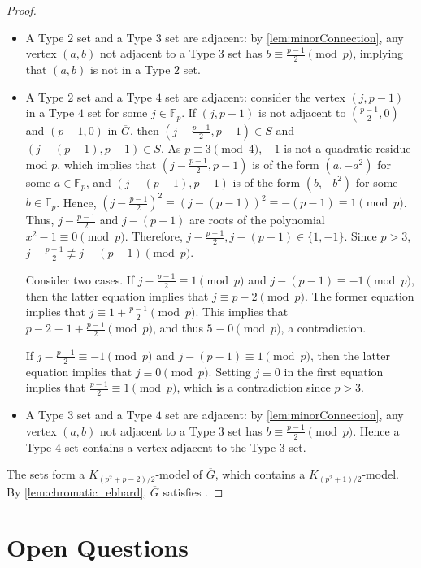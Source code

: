 \documentclass[11pt]{article}
\numberwithin{equation}{section}
\theoremstyle{plain}
\theoremstyle{definition}
\newcommand{\F}{\mathbb{F}}
\begin{document}
\begin{proof}
\begin{itemize}
        \item A Type $2$ set and a Type $3$ set are adjacent: by \cref{lem:minorConnection}, any vertex $(a,b)$ not adjacent to a Type $3$ set has $b \equiv \frac{p-1}{2} \pmod{p}$, implying that $(a,b)$ is not in a Type $2$ set.
        \item A Type $2$ set and a Type $4$ set are adjacent: consider the vertex $(j, p-1)$ in a Type $4$ set for some $j \in \F_p$. If $(j, p-1)$ is not adjacent to $(\frac{p-1}{2} , 0)$ and $(p-1, 0)$ in $\overline{G}$, then $(j - \frac{p-1}{2} , p-1) \in S$ and $(j - (p-1), p-1) \in S$. As $p \equiv 3 \pmod{4}$, $-1$ is not a quadratic residue mod $p$, which implies that $(j - \frac{p-1}{2} , p-1)$ is of the form $(a, -a^2)$ for some $a \in \F_p$, and $(j - (p-1), p-1)$ is of the form $(b, -b^2)$ for some $b \in \F_p$. Hence, $(j- \frac{p-1}{2})^2 \equiv (j - (p-1))^2 \equiv -(p-1) \equiv 1 \pmod{p}$. Thus, $j - \frac{p-1}{2}$ and $j - (p-1)$ are roots of the polynomial $x^2 - 1 \equiv 0 \pmod{p}$. Therefore, $j - \frac{p-1}{2}, j - (p-1) \in \{1, -1\}$. Since $p > 3$, $j - \frac{p-1}{2} \not\equiv j - (p-1) \pmod{p}$.

              Consider two cases. If $j - \frac{p-1}{2} \equiv 1 \pmod{p}$ and $j - (p-1) \equiv -1 \pmod{p}$, then the latter equation implies that $j \equiv p - 2 \pmod{p}$. The former equation implies that $j \equiv 1 + \frac{p-1}{2} \pmod{p}$. This implies that $p - 2 \equiv 1 + \frac{p-1}{2} \pmod{p}$, and thus $5 \equiv 0 \pmod{p}$, a contradiction.

              If $j - \frac{p-1}{2} \equiv -1 \pmod{p}$ and $j - (p-1) \equiv 1 \pmod{p}$, then the latter equation implies that $j \equiv 0 \pmod{p}$. Setting $j \equiv 0$ in the first equation implies that $\frac{p-1}{2} \equiv 1 \pmod{p}$, which is a contradiction since $p > 3$.

        \item A Type $3$ set and a Type $4$ set are adjacent: by \cref{lem:minorConnection}, any vertex $(a,b)$ not adjacent to a Type $3$ set has $b \equiv \frac{p-1}{2} \pmod{p}$. Hence a Type $4$ set contains a vertex adjacent to the Type $3$ set.
    \end{itemize}
    The sets form a $K_{(p^2 + p - 2) / 2}$-model of $\overline{G}$, which contains a $K_{(p^2 + 1) / 2}$-model. By \cref{lem:chromatic_ebhard}, $\overline{G}$ satisfies .
\end{proof}

\section{Open Questions}
\label{s:op}
\label{ss:potential_counteg}
\end{document}

